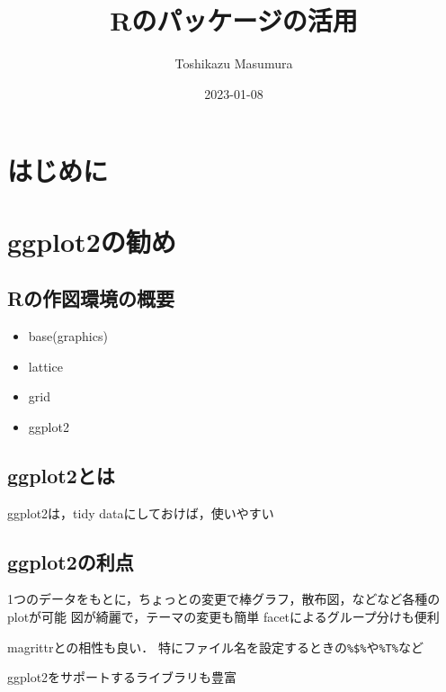 \documentclass[
]{article}
\title{Rのパッケージの活用}
\author{Toshikazu Masumura}
\date{2023-01-08}
\providecommand{\tightlist}{%
  \setlength{\itemsep}{0pt}\setlength{\parskip}{0pt}}
\begin{document}
\maketitle

{
\setcounter{tocdepth}{2}
\tableofcontents
}
\hypertarget{ux306fux3058ux3081ux306b}{%
\section*{はじめに}\label{ux306fux3058ux3081ux306b}}

\hypertarget{ggplot2}{%
\section{ggplot2の勧め}\label{ggplot2}}

\hypertarget{rux306eux4f5cux56f3ux74b0ux5883ux306eux6982ux8981}{%
\subsection{Rの作図環境の概要}\label{rux306eux4f5cux56f3ux74b0ux5883ux306eux6982ux8981}}

\begin{itemize}
\tightlist
\item
  base(graphics)
\item
  lattice
\item
  grid
\item
  ggplot2
\end{itemize}

\hypertarget{ggplot2ux3068ux306f}{%
\subsection{ggplot2とは}\label{ggplot2ux3068ux306f}}

ggplot2は，tidy dataにしておけば，使いやすい

\hypertarget{ggplot2ux306eux5229ux70b9}{%
\subsection{ggplot2の利点}\label{ggplot2ux306eux5229ux70b9}}

1つのデータをもとに，ちょっとの変更で棒グラフ，散布図，などなど各種のplotが可能
図が綺麗で，テーマの変更も簡単
facetによるグループ分けも便利

magrittrとの相性も良い．
特にファイル名を設定するときの\texttt{\%\$\%}や\texttt{\%T\%}など

ggplot2をサポートするライブラリも豊富
\end{document}
